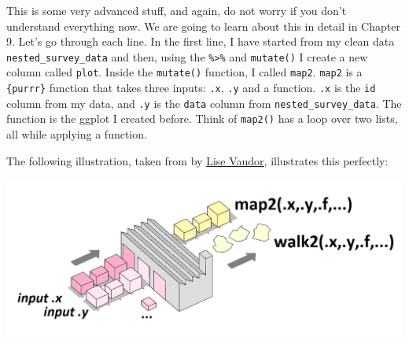 \documentclass[]{gitbook}
\newenvironment{Shaded}{\begin{snugshade}}{\end{snugshade}}
\newcommand{\DataTypeTok}[1]{\textcolor[rgb]{0.13,0.29,0.53}{#1}}
\newcommand{\KeywordTok}[1]{\textcolor[rgb]{0.13,0.29,0.53}{\textbf{#1}}}
\newcommand{\NormalTok}[1]{#1}
\newcommand{\OperatorTok}[1]{\textcolor[rgb]{0.81,0.36,0.00}{\textbf{#1}}}
\newcommand{\StringTok}[1]{\textcolor[rgb]{0.31,0.60,0.02}{#1}}
\begin{document}
\begin{Shaded}
\end{Shaded}

This is some very advanced stuff, and again, do not worry if you don't understand everything now.
We are going to learn about this in detail in Chapter 9. Let's go through each line.
In the first line, I have started from my clean data \texttt{nested\_survey\_data} and then, using the \texttt{\%\textgreater{}\%}
and \texttt{mutate()} I create a new column called \texttt{plot}. Inside the \texttt{mutate()} function, I called \texttt{map2}.
\texttt{map2} is a \texttt{\{purrr\}} function that takes three inputs: \texttt{.x}, \texttt{.y} and a function. \texttt{.x} is the \texttt{id}
column from my data, and \texttt{.y} is the \texttt{data} column from \texttt{nested\_survey\_data}. The function is the
ggplot I created before. Think of \texttt{map2()} has a loop over two lists, all while applying a function.

The following illustration, taken from \citet{vaudor_purrr_2018} by
\href{https://twitter.com/LVaudor}{Lise Vaudor}, illustrates this perfectly:

\includegraphics[width=18.42in]{assets/purrr3}
\end{document}
